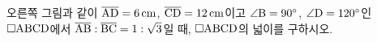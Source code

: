 \noindent\begin{minipage}[t]{0.58\linewidth}\vspace{0pt}\raggedright 오른쪽 그림과 같이 $\overline{\mathrm{AD}}=6\,\mathrm{cm}$, $\overline{\mathrm{CD}}=12\,\mathrm{cm}$이고 $\angle\mathrm{B}=90^\circ$, $\angle\mathrm{D}=120^\circ$인 $\square\mathrm{ABCD}$에서 $\overline{\mathrm{AB}}:\overline{\mathrm{BC}}=1:\sqrt{3}$일 때, $\square\mathrm{ABCD}$의 넓이를 구하시오.\end{minipage}\hfill\begin{minipage}[t]{0.4\linewidth}\vspace{0pt}\centering \resizebox{\ifdim\width>\linewidth\linewidth\else\width\fi}{!}{}\end{minipage}\par
